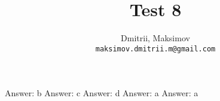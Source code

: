 \documentclass{homework}
\title{Test 8}
\author{
  Dmitrii, Maksimov\\
  \texttt{maksimov.dmitrii.m@gmail.com}
}
\begin{document}
\maketitle

\exercise*
Answer: b
\exercise*
Answer: c
\exercise*
Answer: d
\exercise*
Answer: a
\exercise*
Answer: a
\end{document}

